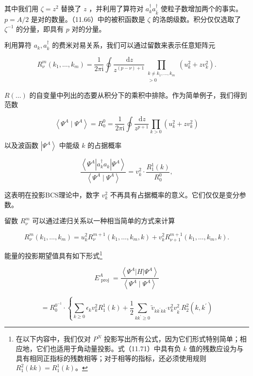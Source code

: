 其中我们用 $\zeta={z}^{2}$ 替换了 $z$ ，并利用了算符对 $a^{\dagger}_{k}a^{\dagger}_{\bar{k}}$
使粒子数增加两个的事实。 $p=A/2$ 是对的数量。（11.66）中的被积函数是 $\zeta$ 的洛朗级数。积分仅仅选取了
${\zeta}^{-1}$ 的分量，即具有 $p$ 对的分量。

利用算符 ${a}_{k},a^{\dagger}_{k}$ 的费米对易关系，我们可以通过留数来表示任意矩阵元

\[
{R}^{m}_{\nu}\left({{k}_{1},\ldots,{k}_{m}}\right)=\frac{1}{2\pi\mathrm{i}}\oint\frac{\,\mathrm{d}z}{{z}^{\left({p-\nu}\right)+1}}\mathop{\prod}\limits_{\substack{{k\neq{k}_{1},\ldots,{k}_{m}}\\
{>0}
}
}\left({{u}^{2}_{k}+z{v}^{2}_{k}}\right).\tag{11.67}
\]

$R\left(\ldots\right)$ 的自变量中列出的态要从积分下的乘积中排除。作为简单例子，我们得到范数

\[
\left\langle {{\Psi}^{A}\mid{\Psi}^{A}}\right\rangle ={R}^{0}_{0}=\frac{1}{2\pi\mathrm{i}}\oint\frac{\,\mathrm{d}z}{{z}^{p+1}}\mathop{\prod}\limits_{{k>0}}\left({{u}^{2}_{k}+z{v}^{2}_{k}}\right)\tag{11.68}
\]

以及波函数 $\left|{\Psi}^{A}\right\rangle $ 中能级 $k$ 的占据概率

\[
\frac{\left\langle {\Psi}^{A}\left|a^{\dagger}_{k}{a}_{k}\right|{\Psi}^{A}\right\rangle }{\left\langle {\Psi}^{A}\mid{\Psi}^{A}\right\rangle }={v}^{2}_{k}\cdot\frac{{R}^{1}_{1}\left(k\right)}{{R}^{0}_{0}},\tag{11.69}
\]

这表明在投影BCS理论中，数字 ${v}^{2}_{k}$ 不再具有占据概率的意义。它们仅仅是变分参数。

留数 ${R}^{m}_{\nu}$ 可以通过递归关系以一种相当简单的方式来计算

\[
{R}^{m}_{\nu}\left({{k}_{1},\ldots,{k}_{m}}\right)={u}^{2}_{k}{R}^{m+1}_{\nu}\left({{k}_{1},\ldots,{k}_{m},k}\right)+{v}^{2}_{k}{R}^{m+1}_{\nu+1}\left({{k}_{1},\ldots,{k}_{m},k}\right).\tag{11.70}
\]

能量的投影期望值具有如下形式\footnote{在以下内容中，我们仅对 $P^{N}$ 投影写出所有公式，因为它们形式特别简单；相应地，它们也适用于角动量投影。式（11.71）中具有负
$k$ 值的残数应设为与具有相同正指标的残数相等；对于相等的指标，还必须使用规则 $R^{2}_{1}(kk)=R^{1}_{1}(k)$。}

\[
{E}^{A}_{\text{ proj }}=\frac{\left\langle {\Psi}^{A}\left|H\right|{\Psi}^{A}\right\rangle }{\left\langle {\Psi}^{A}\mid{\Psi}^{A}\right\rangle }
\]

\[
={R}^{{0}^{-1}}_{0}\cdot\left\{ {\mathop{\sum}\limits_{{k\geq0}}{\epsilon}_{k}{v}^{2}_{k}{R}^{1}_{1}\left(k\right)+\frac{1}{2}\mathop{\sum}\limits_{{k{k}^{\prime}\geq0}}{\widetilde{v}}_{k{k}^{\prime}k{k}^{\prime}}{v}^{2}_{k}{v}^{2}_{{k}^{\prime}}{R}^{2}_{2}\left({k,{k}^{\prime}}\right)}\right.
\]


